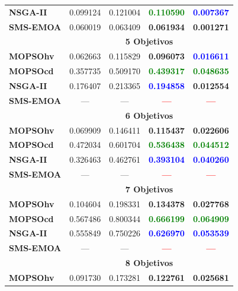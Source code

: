 \begin{longtable}{|l|cc|cc|}
	\textbf{NSGA-II} & 0.099124 & 0.121004 & \textbf{\textcolor{green}{0.110590}} & \textbf{\textcolor{blue}{0.007367}} \\  
	\textbf{SMS-EMOA}& 0.060019 & 0.063409 & \textbf{0.061934} & \textbf{0.001271} \\ 
	\hline\hline
 & \multicolumn{4}{|c|}{\textbf{5 Objetivos}} \\ 
	\hline\hline
	\textbf{MOPSOhv} & 0.062663 & 0.115829 & \textbf{0.096073} & \textbf{\textcolor{blue}{0.016611}}    \\ 
	\textbf{MOPSOcd} & 0.357735 & 0.509170 & \textbf{\textcolor{green}{0.439317}} & \textbf{\textcolor{green}{0.048635}} \\ 
	\textbf{NSGA-II} & 0.176407 & 0.213365 & \textbf{\textcolor{blue}{0.194858}} & \textbf{0.012554}  \\  
	\textbf{SMS-EMOA} & --- & --- & \textbf{\textcolor{red}{---}} & \textbf{\textcolor{red}{---}} \\
	\hline\hline
& \multicolumn{4}{|c|}{\textbf{6 Objetivos}} \\ 
	\hline\hline
	\textbf{MOPSOhv} & 0.069909 & 0.146411 & \textbf{0.115437} & \textbf{0.022606}    \\ 
	\textbf{MOPSOcd} & 0.472034 & 0.601704 & \textbf{\textcolor{green}{0.536438}} & \textbf{\textcolor{green}{0.044512}} \\ 
	\textbf{NSGA-II} & 0.326463 & 0.462761 & \textbf{\textcolor{blue}{0.393104}} & \textbf{\textcolor{blue}{0.040260}} \\  
	\textbf{SMS-EMOA} & --- & --- & \textbf{\textcolor{red}{---}} & \textbf{\textcolor{red}{---}} \\
	\hline\hline
 & \multicolumn{4}{|c|}{\textbf{7 Objetivos}} \\ 
	\hline\hline
	\textbf{MOPSOhv} & 0.104604 & 0.198331 & \textbf{0.134378} & \textbf{0.027768}   \\ 
	\textbf{MOPSOcd} & 0.567486 & 0.800344 & \textbf{\textcolor{green}{0.666199}} & \textbf{\textcolor{green}{0.064909}}  \\ 
	\textbf{NSGA-II} & 0.555849 & 0.750226 & \textbf{\textcolor{blue}{0.626970 }}& \textbf{\textcolor{blue}{0.053539}} \\  
	\textbf{SMS-EMOA} & --- & --- & \textbf{\textcolor{red}{---}} &\textbf{\textcolor{red}{ --- }}\\
	\hline\hline
 & \multicolumn{4}{|c|}{\textbf{8 Objetivos}} \\ 
	\hline\hline
	\textbf{MOPSOhv} & 0.091730 & 0.173281 & \textbf{0.122761} & \textbf{0.025681}   \\ 

\end{longtable}
